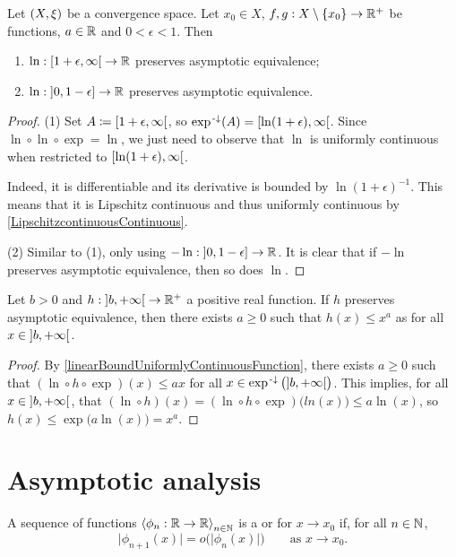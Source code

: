 \begin{corollary}
Let $\sSet{X,\xi}$ be a convergence space. Let $x_0 \in X$, $f,g: X\setminus\{x_0\}\to \mathbb{R}^+$ be functions, $a\in \mathbb{R}$ and $0< \epsilon < 1$. Then
\begin{enumerate}
\item $\ln: \interval[co]{1+\epsilon, \infty} \to \R$ preserves asymptotic equivalence;
\item $\ln: \interval[oc]{0, 1 - \epsilon}\to \R$ preserves asymptotic equivalence.
\end{enumerate}
\end{corollary}
\begin{proof}
(1) Set $A\defeq \interval[co]{1+\epsilon, \infty}$, so $\exp^{\preimf}(A) = \interval[co]{\ln(1+\epsilon), \infty}$. Since $\ln\circ\ln\circ \exp = \ln$, we just need to observe that $\ln$ is uniformly continuous when restricted to $\interval[co]{\ln(1+\epsilon), \infty}$.

Indeed, it is differentiable and its derivative is bounded by $\ln(1+\epsilon)^{-1}$. This means that it is Lipschitz continuous and thus uniformly continuous by \ref{LipschitzcontinuousContinuous}.

(2) Similar to (1), only using $-\ln: \interval[oc]{0, 1 - \epsilon}\to \R$. It is clear that if $-\ln$ preserves asymptotic equivalence, then so does $\ln$.
\end{proof}
\begin{corollary}
Let $b > 0$ and $h: \interval[o]{b,+\infty}\to \R^+$ a positive real function. If $h$ preserves asymptotic equivalence, then there exists $a \geq 0$ such that $h(x) \leq x^a$ as for all $x \in \interval[o]{b,+\infty}$.
\end{corollary}
\begin{proof}
By \ref{linearBoundUniformlyContinuousFunction}, there exists $a \geq 0$ such that $(\ln\circ h \circ \exp)(x) \leq ax$ for all $x\in \exp^{\preimf}\big(\interval[o]{b,+\infty}\big)$. This implies, for all $x\in \interval[o]{b,+\infty}$, that $(\ln \circ h)(x) = (\ln\circ h \circ \exp)\big(ln(x)\big) \leq a\ln(x)$, so $h(x) \leq \exp\big(a\ln(x)\big) = x^a$.
\end{proof}



\section{Asymptotic analysis}
\begin{definition}
A sequence of functions $\left\langle \phi_n:\mathbb{R}\to\mathbb{R} \right\rangle_{n\in\mathbb{N}}$ is a  or  for $x\to x_0$ if, for all $n\in \mathbb{N}$,
\[ \big|\phi_{n+1}(x)\big| = o\big(\big|\phi_n(x)\big|\big) \qquad\text{as $x\to x_0$.} \]
\end{definition}

